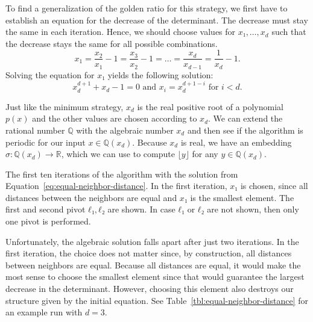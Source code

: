 To find a generalization of the golden ratio for this strategy,
we first have to establish an equation for the decrease of the determinant.
The decrease must stay the same in each iteration.
Hence, we should choose values for $x₁, \dots, x_d$ such that the decrease
stays the same for all possible combinations.
\begin{equation}
  \label{eq:equal-neighbor-distance}
  x_1 = \frac{x_2}{x_1} - 1 = \frac{x_3}{x_2} - 1 = \dots = \frac{x_d}{x_{d-1}} = \frac{1}{x_d} - 1.
\end{equation}
Solving the equation for $x₁$ yields the following solution:
\[
  x_d^{d+1} + x_d - 1 = 0 \text{ and } x_i = x_d^{d+1-i} \text{ for } i < d.
\]

Just like the minimum strategy, $x_d$ is the real positive root of a polynomial $p(x)$
and the other values are chosen according to $x_d$.
We can extend the rational number $ℚ$ with the algebraic number $x_d$ and then
see if the algorithm is periodic for our input $x ∈ ℚ(x_d)$.
Because $x_d$ is real, we have an embedding $σ \colon ℚ(x_d) → ℝ$,
which we can use to compute $\lfloor y \rfloor$ for any $y ∈ ℚ(x_d)$.

\begin{table}[b]
  \label{tbl:equal-neighbor-distance}
  \caption{
    The first ten iterations of the algorithm with the solution from
    Equation~\ref{eq:equal-neighbor-distance}.
    In the first iteration, $x₁$ is chosen, since all distances between the
    neighbors are equal and $x₁$ is the smallest element.
    The first and second pivot $ℓ₁, ℓ₂$ are shown.
    In case $ℓ₁$ or $ℓ₂$ are not shown, then only one pivot is performed.}
  \centering
  
\end{table}

Unfortunately, the algebraic solution falls apart after just two iterations.
In the first iteration, the choice does not matter since, by construction, all
distances between neighbors are equal.
Because all distances are equal, it would make the most sense to choose the
smallest element since that would guarantee the largest decrease in the
determinant.
However, choosing this element also destroys our structure given by the initial
equation.
See Table~\ref{tbl:equal-neighbor-distance} for an example run with $d = 3$.

